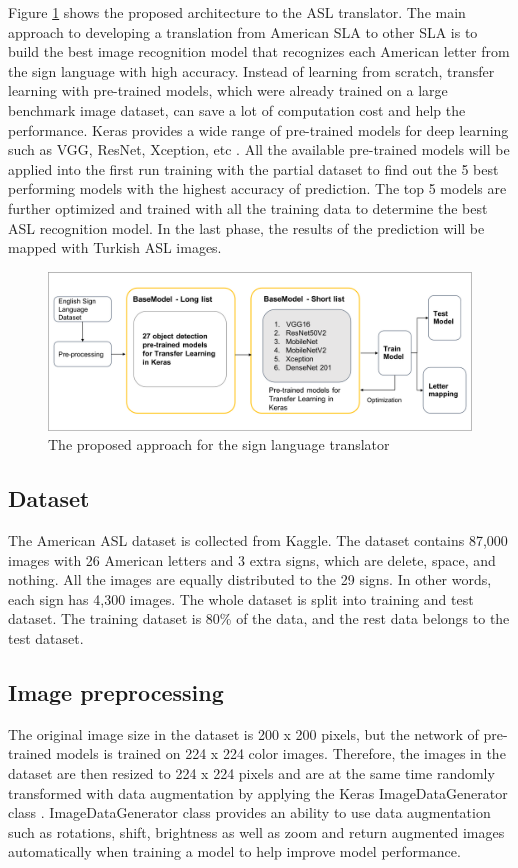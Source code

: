 Figure \ref{fig:the proposed approach} shows the proposed architecture to the ASL translator. The main approach to developing a translation from American SLA to other SLA is to build the best image recognition model that recognizes each American letter from the sign language with high accuracy. Instead of learning from scratch, transfer learning with pre-trained models, which were already trained on a large benchmark image dataset, can save a lot of computation cost and help the performance. Keras provides a wide range of pre-trained models for deep learning such as VGG, ResNet, Xception, etc \cite{keras}. All the available pre-trained models will be applied into the first run training with the partial dataset to find out the 5 best performing models with the highest accuracy of prediction. The top 5 models are further optimized and trained with all the training data to determine the best ASL recognition model. In the last phase, the results of the prediction will be mapped with Turkish ASL images.

\begin{figure}[h]
    \centering
    \caption{The proposed approach for the sign language translator}
	\label{fig:the proposed approach}
    \includegraphics[width=\linewidth]{figures/The approach}
\end{figure}


\subsection{Dataset}
The American ASL dataset is collected from Kaggle. The dataset contains 87,000 images with 26 American letters and 3 extra signs, which are delete, space, and nothing. All the images are equally distributed to the 29 signs. In other words, each sign has 4,300 images. The whole dataset is split into training and test dataset. The training dataset is 80\% of the data, and the rest data belongs to the test dataset. 


\subsection{Image preprocessing}
The original image size in the dataset is 200 x 200 pixels, but the network of pre-trained models is trained on 224 x 224 color images. Therefore, the images in the dataset are then resized to 224 x 224 pixels and are at the same time randomly transformed with data augmentation by applying the Keras ImageDataGenerator class \cite{keras}. ImageDataGenerator class provides an ability to use data augmentation such as rotations, shift, brightness as well as zoom and return augmented images automatically when training a model to help improve model performance.


